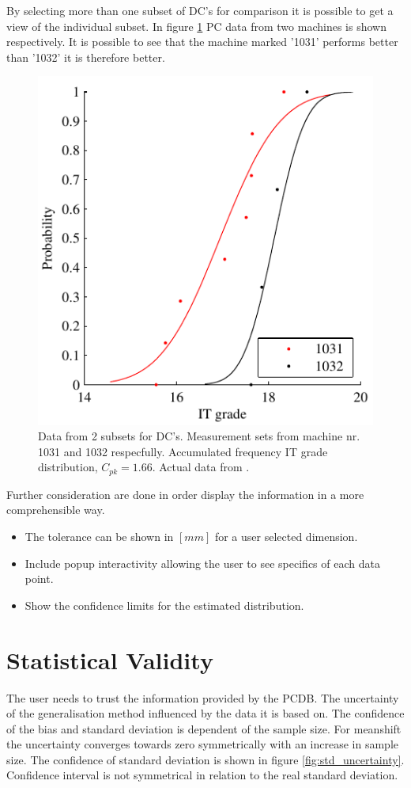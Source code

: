 \documentclass[aip,amsmath, reprint, author-year]{revtex4-1}
\begin{document}
By selecting more than one subset of DC's for comparison it is possible to get a view of the individual subset. In figure \ref{fig:acumfreqF3} PC data from two machines is shown respectively. It is possible to see that the machine marked '1031' performs better than '1032' it is therefore better.

\begin{figure}
\includegraphics{Acum_freqF3.pdf}
\caption{\label{fig:acumfreqF3} Data from 2 subsets for DC's. Measurement sets from machine nr. 1031 and 1032 respecfully. Accumulated frequency IT grade distribution, $C_{pk} =1.66$. Actual data from \cite{thornton2000use}. }
\end{figure}

Further consideration are done in order display the information in a more comprehensible way.
\begin{itemize}
\item The tolerance can be shown in $[mm]$ for a user selected dimension.
\item Include popup interactivity allowing the user to see specifics of each data point.
\item Show the confidence limits for the estimated distribution.
\end{itemize}

\section{Statistical Validity}
The user needs to trust the information provided by the PCDB. The uncertainty of the generalisation method influenced by the data it is based on. The confidence of the bias and standard deviation is dependent of the sample size. For meanshift the uncertainty converges towards zero symmetrically with an increase in sample size. The confidence of standard deviation is shown in figure \ref{fig:std_uncertainty}. Confidence interval is not symmetrical in relation to the real standard deviation.
\end{document}
